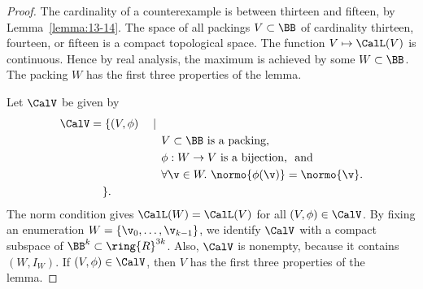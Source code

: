 \begin{proof} 
  The cardinality of a counterexample is between thirteen and fifteen, by
  Lemma~\ref{lemma:13-14}.  The space of all packings $V\subset \BB$
  of cardinality thirteen, fourteen, or fifteen is a compact topological space.
  The function $V\mapsto {\CalL(V)}$ is continuous.  Hence by 
    real analysis, the maximum is achieved by some $W\subset \BB$.
The packing $W$ has the first three properties of the lemma.

%
Let $\CalV$ be given by
\begin{alignat*}{8}
\CalV &= 
\{
(V,\phi) &&\mid \\
 &&&\quad  V\subset \BB \text{ is a packing, }\\
 &&&\quad \phi:W\to V \text{ is a bijection, ~and }\\
 &&&\quad\forall \v\in W.~\normo{\phi(\v)}=\normo{\v}.\\
&\phantom{=~}\}.
\end{alignat*}
The norm condition gives $\CalL(W)=\CalL(V)$ for all $(V,\phi)\in \CalV$.
By fixing an enumeration $W=\{\v_0,\ldots,\v_{k-1}\}$, we identify
$\CalV$ with a compact subspace of $\BB^k\subset\ring{R}^{3k}$.
Also, $\CalV$ is nonempty, because it contains $(W,I_{W})$.
If $(V,\phi)\in \CalV$, then $V$ has the first three properties of the lemma.



\end{proof}
